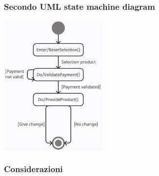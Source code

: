 \documentclass{article}
\begin{document}
\subsubsection*{Secondo UML state machine diagram}
\large
\begin{center}
    \includegraphics[width=0.4\textwidth]{foto 8.png}    
\end{center}
    
\subsubsection*{Considerazioni}
\large
\end{document}
